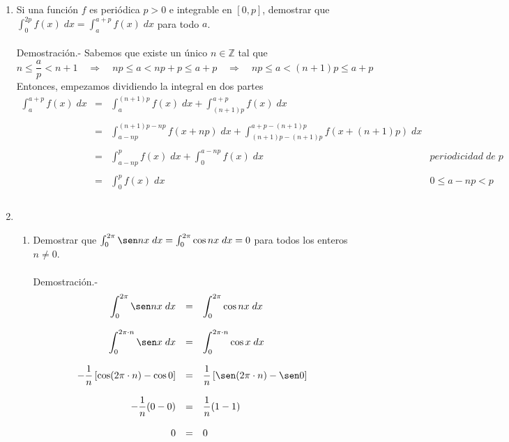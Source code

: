 \begin{enumerate}[\bfseries 1.]
\item Si una función $f$ es periódica $p>0$ e integrable en $[0,p]$, demostrar que $\int_{0}^{2p} f(x)\; dx = \int_a^{a+p} f(x)\; dx$ para todo $a$.\\\\
    Demostración.-\; Sabemos que existe un único $n\in \mathbb{Z}$ tal que 
    $$n\leq \dfrac{a}{p}<n+1 \quad \Longrightarrow \quad np\leq a < np + p \leq a + p \quad \Longrightarrow \quad np\leq a < (n+1)p\leq a+p$$
    Entonces, empezamos dividiendo la integral en dos partes\\ 
    $$\begin{array}{rcll}
	\displaystyle\int_{a}^{a+p}f(x) \; dx&=&\displaystyle\int_{a}^{(n+1)p}f(x) \; dx + \displaystyle\int_{(n+1)p}^{a+p}f(x) \; dx &\\\\
					     &=&\displaystyle\int_{a-np}^{(n+1)p-np} f(x+np) \; dx + \displaystyle\int_{(n+1)p-(n+1)p}^{a+p-(n+1)p} f(x+(n+1)p)  \; dx &\\\\
					     &=&\displaystyle\int_{a-np}^{p} f(x) \; dx + \displaystyle\int_{0}^{a-np} f(x) \; dx & periodicidad \; de \; p\\\\
					     &=&\displaystyle\int_{0}^{p} f(x) \; dx &  0\leq a-np<p\\\\
    \end{array}$$

\item
\begin{enumerate}[\bfseries (a)]

    \item Demostrar que $\int_0^{2\pi} \sen nx \;dx = \int_0^{2\pi} \cos nx \; dx = 0$ para todos los enteros $n\neq 0$.\\\\
	Demostración.-\; 
	$$\begin{array}{rcl}
	    \displaystyle\int_0^{2\pi} \sen nx\; dx&=&\displaystyle\int_0^{2\pi}\cos nx\; dx\\\\
	    \displaystyle\int_0^{2\pi\cdot n}\sen x \; dx&=&\displaystyle\int_0^{2\pi\cdot n}\cos x \; dx\\\\
	    -\dfrac{1}{n}\left[\cos(2\pi\cdot n)-\cos 0\right]&=&\dfrac{1}{n} \left[\sen(2\pi\cdot n) - \sen 0\right]\\\\
	    -\dfrac{1}{n}(0-0)&=&\dfrac{1}{n}(1-1)\\\\
	    0&=&0\\\\
	\end{array}$$


\end{enumerate}
\end{enumerate}
